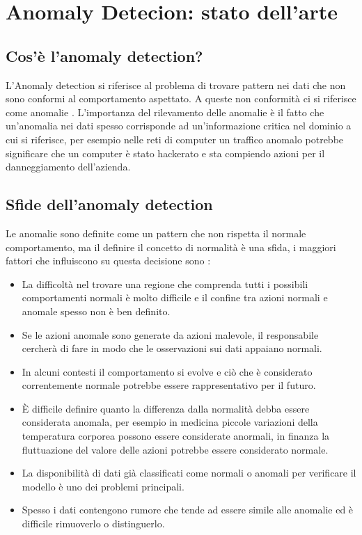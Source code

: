 
\chapter{Anomaly Detecion: stato dell'arte}

\section{Cos'è l'anomaly detection?}


L'Anomaly detection si riferisce al problema di trovare pattern nei dati che non sono conformi al comportamento aspettato. A queste non conformità ci si riferisce come anomalie \cite{anomaly_detection_survey_3}. L'importanza del rilevamento delle anomalie è il fatto che un'anomalia nei dati spesso corrisponde ad un'informazione critica nel dominio a cui si riferisce, per esempio nelle reti di computer un traffico anomalo potrebbe significare che un computer è stato hackerato e sta compiendo azioni per il danneggiamento dell'azienda.

\section{Sfide dell'anomaly detection}

Le anomalie sono definite come un pattern che non rispetta il normale comportamento, ma il definire il concetto di normalità è una sfida, i maggiori fattori che influiscono su questa decisione sono \cite{anomaly_detection_survey_3}:

\begin{itemize}
    \item La difficoltà nel trovare una regione che comprenda tutti i possibili comportamenti normali è molto difficile e il confine tra azioni normali e anomale spesso non è ben definito.
    \item Se le azioni anomale sono generate da azioni malevole, il responsabile cercherà di fare in modo che le osservazioni sui dati appaiano normali.
    \item In alcuni contesti il comportamento si evolve e ciò che è considerato correntemente normale potrebbe essere rappresentativo per il futuro.
    \item È difficile definire quanto la differenza dalla normalità debba essere considerata anomala, per esempio in medicina piccole variazioni della temperatura corporea possono essere considerate anormali, in finanza la fluttuazione del valore delle azioni potrebbe essere considerato normale.
    \item La disponibilità di dati già classificati come normali o anomali per verificare il modello è uno dei problemi principali.
    \item Spesso i dati contengono rumore che tende ad essere simile alle anomalie ed è difficile rimuoverlo o distinguerlo.
\end{itemize}

